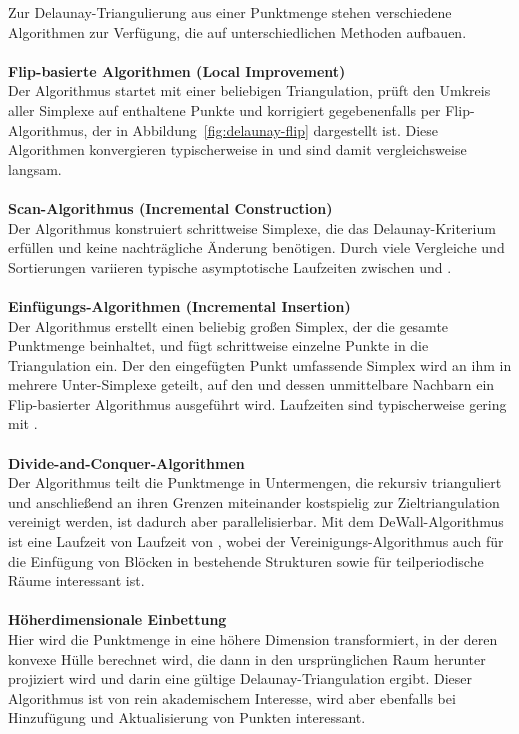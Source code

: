 Zur Delaunay-Triangulierung aus einer Punktmenge stehen verschiedene Algorithmen zur Verfügung, die auf unterschiedlichen Methoden aufbauen.
\\\\
\textbf{Flip-basierte Algorithmen (Local Improvement)}\\
Der Algorithmus startet mit einer beliebigen Triangulation, prüft den Umkreis aller Simplexe auf enthaltene Punkte und korrigiert gegebenenfalls per Flip-Algorithmus, der in Abbildung~\ref{fig:delaunay-flip} dargestellt ist.
Diese Algorithmen konvergieren typischerweise in  und sind damit vergleichsweise langsam.
\\\\
\textbf{Scan-Algorithmus (Incremental Construction)}\\
Der Algorithmus konstruiert schrittweise Simplexe, die das Delaunay-Kriterium erfüllen und keine nachträgliche Änderung benötigen.
Durch viele Vergleiche und Sortierungen variieren typische asymptotische Laufzeiten zwischen  und .
\\\\
\textbf{Einfügungs-Algorithmen (Incremental Insertion)}\\
Der Algorithmus erstellt einen beliebig großen Simplex, der die gesamte Punktmenge beinhaltet, und fügt schrittweise einzelne Punkte in die Triangulation ein.
Der den eingefügten Punkt umfassende Simplex wird an ihm in mehrere Unter-Simplexe geteilt, auf den und dessen unmittelbare Nachbarn ein Flip-basierter Algorithmus ausgeführt wird.
Laufzeiten sind typischerweise gering mit .
\\\\
\textbf{Divide-and-Conquer-Algorithmen}\\
Der Algorithmus teilt die Punktmenge in Untermengen, die rekursiv trianguliert und anschließend an ihren Grenzen miteinander kostspielig zur Zieltriangulation vereinigt werden, ist dadurch aber parallelisierbar.
Mit dem DeWall-Algorithmus\cite{cignoni_dewall:_1998} ist eine Laufzeit von Laufzeit von , wobei der Vereinigungs-Algorithmus auch für die Einfügung von Blöcken in bestehende Strukturen sowie für teilperiodische Räume interessant ist.
\\\\
\textbf{Höherdimensionale Einbettung}\\
Hier wird die Punktmenge in eine höhere Dimension transformiert, in der deren konvexe Hülle berechnet wird, die dann in den ursprünglichen Raum herunter projiziert wird und darin eine gültige Delaunay-Triangulation ergibt.
Dieser Algorithmus ist von rein akademischem Interesse, wird aber ebenfalls bei Hinzufügung und Aktualisierung von Punkten interessant.

